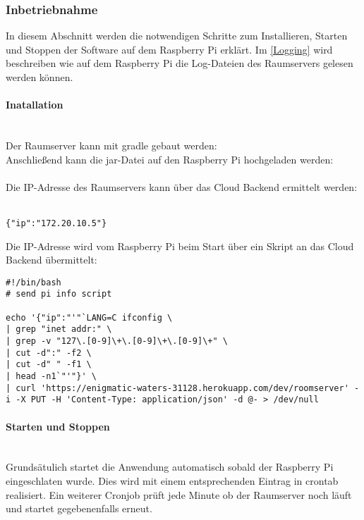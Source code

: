 \subsubsection{Inbetriebnahme}
In diesem Abschnitt werden die notwendigen Schritte zum Installieren, Starten und Stoppen der Software auf dem Raspberry Pi erklärt. Im \autoref{Logging} wird beschreiben wie auf dem Raspberry Pi die Log-Dateien des Raumservers gelesen werden können.

\paragraph{Inatallation}\mbox{}\\
Der Raumserver kann mit gradle gebaut werden:
\\
Anschließend kann die jar-Datei auf den Raspberry Pi hochgeladen werden:\\
\\

Die IP-Adresse des Raumservers kann über das Cloud Backend ermittelt werden:\\
\\

\vspace{2em}
\begin{lstlisting}
{"ip":"172.20.10.5"}
\end{lstlisting}
\vspace{2em}

Die IP-Adresse wird vom Raspberry Pi beim Start über ein Skript an das Cloud Backend übermittelt:\\
\vspace{2em}
\begin{lstlisting}
#!/bin/bash
# send pi info script

echo '{"ip":"'"`LANG=C ifconfig \
| grep "inet addr:" \
| grep -v "127\.[0-9]\+\.[0-9]\+\.[0-9]\+" \
| cut -d":" -f2 \
| cut -d" " -f1 \
| head -n1`"'"}' \
| curl 'https://enigmatic-waters-31128.herokuapp.com/dev/roomserver' -i -X PUT -H 'Content-Type: application/json' -d @- > /dev/null
\end{lstlisting}
\vspace{2em}

\paragraph{Starten und Stoppen}\mbox{}\\
Grundsätulich startet die Anwendung automatisch sobald der Raspberry Pi eingeschlaten wurde. Dies wird mit einem entsprechenden Eintrag in crontab realisiert. Ein weiterer Cronjob prüft jede Minute ob der Raumserver noch läuft und startet gegebenenfalls erneut.

